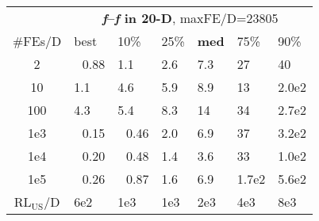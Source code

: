 \begin{tabular}{c|llllll}
 & \multicolumn{6}{|c}{\textbf{\textit{f}\raisebox{-0.35ex}{1}--\textit{f}\raisebox{-0.35ex}{24} in 20-D}, maxFE/D=23805}\\
\#FEs/D & best & 10\% & 25\% & \textbf{med} & 75\% & 90\%\\
2 & ~\,0.88 & \hspace*{1ex}1.1 & \hspace*{1ex}2.6 & \hspace*{1ex}7.3 & 27 & 40\\
10 & \hspace*{1ex}1.1 & \hspace*{1ex}4.6 & \hspace*{1ex}5.9 & \hspace*{1ex}8.9 & 13 & 2.0e2\\
100 & \hspace*{1ex}4.3 & \hspace*{1ex}5.4 & \hspace*{1ex}8.3 & 14 & 34 & 2.7e2\\
1e3 & ~\,0.15 & ~\,0.46 & \hspace*{1ex}2.0 & \hspace*{1ex}6.9 & 37 & 3.2e2\\
1e4 & ~\,0.20 & ~\,0.48 & \hspace*{1ex}1.4 & \hspace*{1ex}3.6 & 33 & 1.0e2\\
1e5 & ~\,0.26 & ~\,0.87 & \hspace*{1ex}1.6 & \hspace*{1ex}6.9 & 1.7e2 & 5.6e2\\
$\text{RL}_{\text{US}}$/D & 6e2 & 1e3 & 1e3 & 2e3 & 4e3 & 8e3
\end{tabular}
